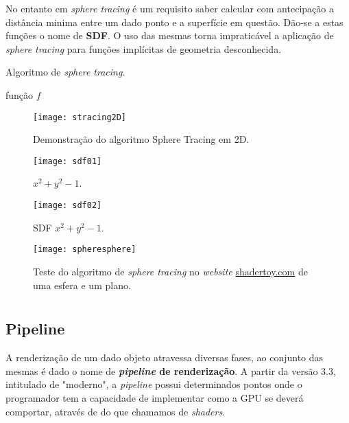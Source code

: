 No entanto em \textit{sphere tracing} é um requisito saber calcular com antecipação a distância minima entre um dado ponto e a superfície em questão. Dão-se a estas funções o nome de \textbf{\ac{SDF}}. O uso das mesmas torna impraticável a aplicação de \textit{sphere tracing} para funções implícitas de geometria desconhecida.

\begin{algorithm}[!htbp]
	\caption{Algoritmo de \textit{sphere tracing}.}
	\label{alg::raymarch_spheretrace}
	\begin{algorithmic}
		\Require função $f$      
	\end{algorithmic}
\end{algorithm}

\begin{figure}[!htbp]
	\centering
	\texttt{[image: stracing2D]}
	\caption[Demonstração do algoritmo Sphere Tracing em 2D]{Demonstração do algoritmo Sphere Tracing em 2D.}
	\label{fig::stracing2D}
\end{figure}

\begin{figure}[!htbp]
	\centering
	\texttt{[image: sdf01]}
	\caption[]{$x^2 + y^2 - 1$.}
	\label{fig::sdf01}
\end{figure}

\begin{figure}[!htbp]
	\centering
	\texttt{[image: sdf02]}
	\caption[]{\acf{SDF} $x^2 + y^2 - 1$.}
	\label{fig::sdf02}
\end{figure}

\begin{figure}[!htbp]
	\centering
	\texttt{[image: spheresphere]}
	\caption[Teste do algoritmo de \textit{sphere tracing}]{Teste do algoritmo de \textit{sphere tracing} no \textit{website} \url{shadertoy.com} de uma esfera e um plano.}
	\label{fig::spheresphere}
\end{figure}


\section{\opengl}
\label{sec::arte:opengl}



\subsection{Pipeline}
A renderização de um dado objeto atravessa diversas fases, ao conjunto das mesmas é dado o nome de \textbf{\textit{pipeline} de renderização}. A partir da versão 3.3, intitulado de "\opengl moderno", a \textit{pipeline} possui determinados pontos onde o programador tem a capacidade de implementar como a \ac{GPU} se deverá comportar, através de do que chamamos de \textit{shaders}.

